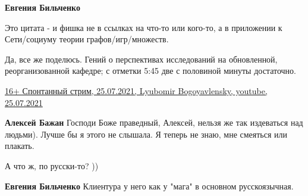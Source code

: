 \begin{itemize}
\begin{itemize}
\textbf{Евгения Бильченко} 

Это цитата - и фишка не в ссылках на что-то или
кого-то, а в приложении к Сети/социуму теории графов/игр/множеств.

\end{itemize}

 

Да, все же поделюсь. Гений о перспективах исследований на обновленной,
реорганизованной кафедре; с отметки 5:45 две с половиной минуты достаточно.

\href{https://www.youtube.com/watch?v=ycvIn9RMFAc&t=345s}{%
16+ Спонтанный стрим, 25.07.2021, Lyubomir Bogoyavlensky, youtube, 25.07.2021%
}

\begin{itemize}
 
\textbf{Алексей Бажан} Господи Боже праведный, Алексей, нельзя же так издеваться над людьми). Лучше бы я этого не слышала. Я теперь не знаю, мне смеяться или плакать.

 
А что ж, по русски-то? ))

 
\textbf{Евгения Бильченко} Клиентура у него как у "мага" в основном русскоязычная.

 

\end{itemize}
\end{itemize}
